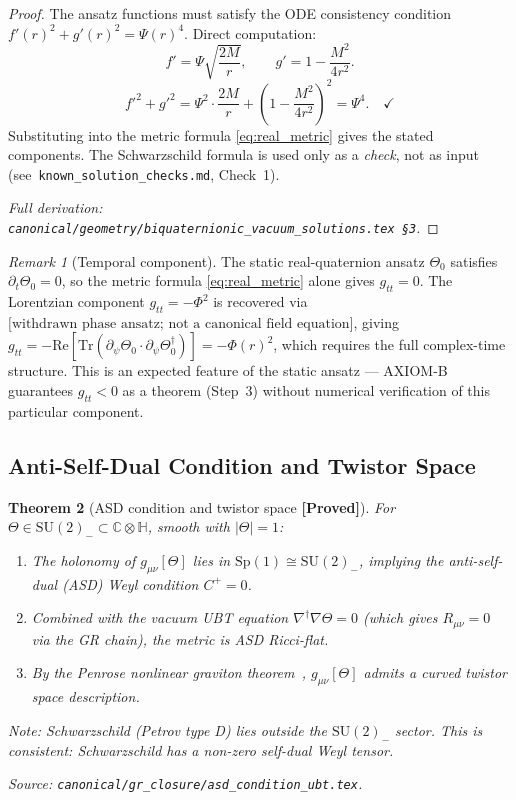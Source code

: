 \documentclass[12pt,a4paper]{article}
\newtheorem{theorem}{Theorem}[section]
\theoremstyle{definition}
\theoremstyle{remark}
\newtheorem{remark}[theorem]{Remark}
\newcommand{\PROVED}{\textbf{[Proved]}}
\newcommand{\C}{\mathbb{C}}
\newcommand{\Hquat}{\mathbb{H}}
\newcommand{\Tr}{\mathrm{Tr}}
\newcommand{\Re}{\mathrm{Re}}
\begin{document}
\begin{proof}
The ansatz functions must satisfy the ODE consistency condition
$f'(r)^2 + g'(r)^2 = \Psi(r)^4$.  Direct computation:
\[
  f' = \Psi\sqrt{\frac{2M}{r}}, \qquad
  g' = 1 - \frac{M^2}{4r^2}.
\]
\[
  f'^2 + g'^2
    = \Psi^2\cdot\frac{2M}{r} + \left(1-\frac{M^2}{4r^2}\right)^2
    = \Psi^4. \quad\checkmark
\]
Substituting into the metric formula \eqref{eq:real_metric} gives the stated
components.  The Schwarzschild formula is used only as a \emph{check}, not as
input (see~\texttt{known\_solution\_checks.md}, Check~1).

\noindent\textit{Full derivation: \texttt{canonical/geometry/biquaternionic\_vacuum\_solutions.tex~\S3}.}
\end{proof}

\begin{remark}[Temporal component]\label{rem:gtt}
The static real-quaternion ansatz $\Theta_0$ satisfies $\partial_t\Theta_0 = 0$,
so the metric formula \eqref{eq:real_metric} alone gives $g_{tt} = 0$.  The
Lorentzian component $g_{tt} = -\Phi^2$ is recovered via
$\text{[withdrawn phase ansatz; not a canonical field equation]}$, giving
$g_{tt} = -\Re[\Tr(\partial_\psi\Theta_0\cdot\partial_\psi\Theta_0^\dagger)] = -\Phi(r)^2$,
which requires the full complex-time structure.  This is an expected feature of the
static ansatz --- AXIOM-B guarantees $g_{tt} < 0$ as a theorem (Step~3) without
numerical verification of this particular component.
\end{remark}

\subsection{Anti-Self-Dual Condition and Twistor Space}
\label{sec:asd}

\begin{theorem}[ASD condition and twistor space \PROVED]
\label{thm:asd}
For $\Theta \in \mathrm{SU}(2)_- \subset \C\otimes\Hquat$, smooth with $|\Theta|=1$:
\begin{enumerate}
  \item The holonomy of $g_{\mu\nu}[\Theta]$ lies in
    $\mathrm{Sp}(1) \cong \mathrm{SU}(2)_-$, implying the anti-self-dual (ASD)
    Weyl condition $C^+ = 0$.
  \item Combined with the vacuum UBT equation $\nabla^\dagger\nabla\Theta = 0$
    (which gives $R_{\mu\nu} = 0$ via the GR chain), the metric is ASD Ricci-flat.
  \item By the Penrose nonlinear graviton theorem~\cite{Penrose1976},
    $g_{\mu\nu}[\Theta]$ admits a curved twistor space description.
\end{enumerate}
\emph{Note}: Schwarzschild (Petrov type D) lies outside the $\mathrm{SU}(2)_-$
sector.  This is consistent: Schwarzschild has a non-zero self-dual Weyl tensor.

\noindent\textit{Source: \texttt{canonical/gr\_closure/asd\_condition\_ubt.tex}.}
\end{theorem}
\end{document}
